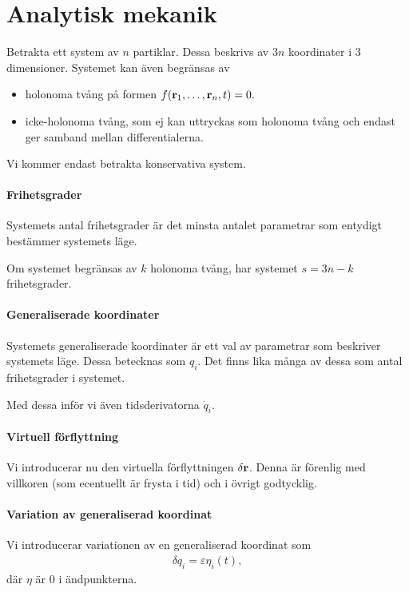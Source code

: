 \section{Analytisk mekanik}
Betrakta ett system av $n$ partiklar. Dessa beskrivs av $3n$ koordinater i $3$ dimensioner. Systemet kan även begränsas av
\begin{itemize}
	\item holonoma tvång på formen $f(\vb{r}_{1}, \dots, \vb{r}_{n}, t) = 0.$
	\item icke-holonoma tvång, som ej kan uttryckas som holonoma tvång och endast ger samband mellan differentialerna.
\end{itemize}
Vi kommer endast betrakta konservativa system.

\paragraph{Frihetsgrader}
Systemets antal frihetsgrader är det minsta antalet parametrar som entydigt bestämmer systemets läge.

Om systemet begränsas av $k$ holonoma tvång, har systemet $s = 3n - k$ frihetsgrader.

\paragraph{Generaliserade koordinater}
Systemets generaliserade koordinater är ett val av parametrar som beskriver systemets läge. Dessa betecknas som $q_{i}$. Det finns lika många av dessa som antal frihetsgrader i systemet.

Med dessa inför vi även tidsderivatorna $\dot{q}_{i}$.

\paragraph{Virtuell förflyttning}
Vi introducerar nu den virtuella förflyttningen $\delta\vb{r}$. Denna är förenlig med villkoren (som ecentuellt är frysta i tid) och i övrigt godtycklig.

\paragraph{Variation av generaliserad koordinat}
Vi introducerar variationen av en generaliserad koordinat som
\begin{align*}
	\delta q_{i} = \varepsilon\eta_{i}(t),
\end{align*}
där $\eta$ är $0$ i ändpunkterna.

